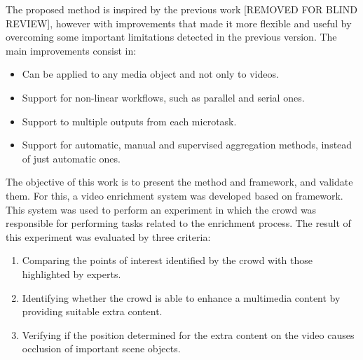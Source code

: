 

The proposed method is inspired by the previous work [REMOVED FOR BLIND REVIEW]\citep{172450}, however with improvements that made it more flexible and useful by overcoming some important limitations detected in the previous version. The main improvements consist in:
\begin{itemize}

\item Can be applied to any media object and not only to videos.

\item Support for non-linear workflows, such as parallel and serial ones.

\item Support to multiple outputs from each microtask.

\item Support for automatic, manual and supervised aggregation methods, instead of just automatic ones.


\end{itemize}

The objective of this work is to present the method and framework, and validate them. For this, a video enrichment system was developed based on framework. This system was used to perform an experiment in which the crowd was responsible for performing tasks related to the enrichment process. The result of this experiment was evaluated by three criteria:

\begin{enumerate}
\item Comparing the points of interest identified by the crowd with those highlighted by experts.
\item Identifying whether the crowd is able to enhance a multimedia content by providing suitable extra content. 
\item Verifying if the position determined for the extra content on the video causes occlusion of important scene objects.
\end{enumerate}



